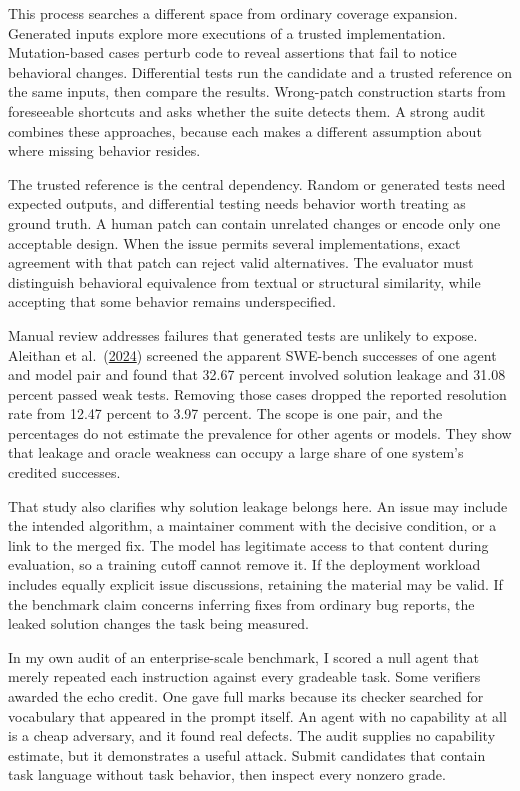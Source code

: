 This process searches a different space from ordinary coverage expansion. Generated inputs explore more executions of a trusted implementation. Mutation-based cases perturb code to reveal assertions that fail to notice behavioral changes. Differential tests run the candidate and a trusted reference on the same inputs, then compare the results. Wrong-patch construction starts from foreseeable shortcuts and asks whether the suite detects them. A strong audit combines these approaches, because each makes a different assumption about where missing behavior resides.

The trusted reference is the central dependency. Random or generated tests need expected outputs, and differential testing needs behavior worth treating as ground truth. A human patch can contain unrelated changes or encode only one acceptable design. When the issue permits several implementations, exact agreement with that patch can reject valid alternatives. The evaluator must distinguish behavioral equivalence from textual or structural similarity, while accepting that some behavior remains underspecified.

Manual review addresses failures that generated tests are unlikely to expose. Aleithan et al.~(\href{https://arxiv.org/abs/2410.06992}{2024}) screened the apparent SWE-bench successes of one agent and model pair and found that 32.67 percent involved solution leakage and 31.08 percent passed weak tests. Removing those cases dropped the reported resolution rate from 12.47 percent to 3.97 percent. The scope is one pair, and the percentages do not estimate the prevalence for other agents or models. They show that leakage and oracle weakness can occupy a large share of one system's credited successes.

That study also clarifies why solution leakage belongs here. An issue may include the intended algorithm, a maintainer comment with the decisive condition, or a link to the merged fix. The model has legitimate access to that content during evaluation, so a training cutoff cannot remove it. If the deployment workload includes equally explicit issue discussions, retaining the material may be valid. If the benchmark claim concerns inferring fixes from ordinary bug reports, the leaked solution changes the task being measured.

In my own audit of an enterprise-scale benchmark, I scored a null agent that merely repeated each instruction against every gradeable task. Some verifiers awarded the echo credit. One gave full marks because its checker searched for vocabulary that appeared in the prompt itself. An agent with no capability at all is a cheap adversary, and it found real defects. The audit supplies no capability estimate, but it demonstrates a useful attack. Submit candidates that contain task language without task behavior, then inspect every nonzero grade.

